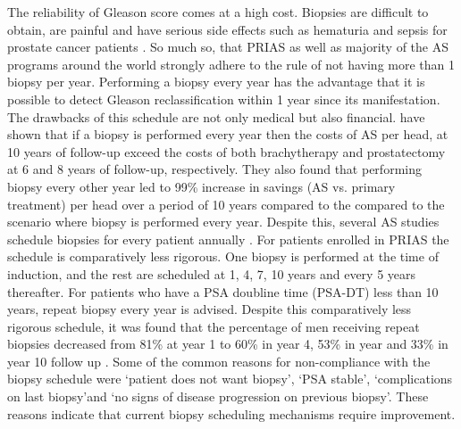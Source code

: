 The reliability of Gleason score comes at a high cost. Biopsies are difficult to obtain, are painful and have serious side effects such as hematuria and sepsis for prostate cancer patients \citep{loeb2013systematic}. So much so, that PRIAS as well as majority of the AS programs around the world strongly adhere to the rule of not having more than 1 biopsy per year. Performing a biopsy every year has the advantage that it is possible to detect Gleason reclassification within 1 year since its manifestation. The drawbacks of this schedule are not only medical but also financial. \cite{keegan2012active} have shown that if a biopsy is performed every year then the costs of AS per head, at 10 years of follow-up exceed the costs of both brachytherapy and prostatectomy at 6 and 8 years of follow-up, respectively. They also found that performing biopsy every other year led to 99\% increase in savings (AS vs. primary treatment) per head over a period of 10 years compared to the compared to the scenario where biopsy is performed every year. Despite this, several AS studies schedule biopsies for every patient annually \citep{tosoian2011active,welty2015extended}. For patients enrolled in PRIAS the schedule is comparatively less rigorous. One biopsy is performed at the time of induction, and the rest are scheduled at 1, 4, 7, 10 years and every 5 years thereafter. For patients who have a PSA doubline time (PSA-DT) less than 10 years, repeat biopsy every year is advised. Despite this comparatively less rigorous schedule, it was found that the percentage of men receiving repeat biopsies decreased from 81\% at year 1 to 60\% in year 4, 53\% in year and 33\% in year 10 follow up \cite{bokhorst2015compliance}. Some of the common reasons for non-compliance with the biopsy schedule were \textquoteleft patient does not want biopsy\textquoteright, \textquoteleft PSA stable\textquoteright, \textquoteleft complications on last biopsy\textquoteright and \textquoteleft no signs of disease progression on previous biopsy\textquoteright. These reasons indicate that current biopsy scheduling mechanisms require improvement.\\ 

